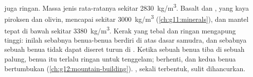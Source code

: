  juga ringan. Massa jenis rata-ratanya sekitar
\qty{2830}{kg/m^3}. Basalt dan  , yang kaya piroksen dan
olivin, mencapai sekitar \qty{3000}{kg/m^3} (\cref{ch:g11:minerals}), dan mantel
tepat di bawah  sekitar \qty{3380}{kg/m^3}. Kerak yang tebal dan ringan
mengapung tinggi: inilah sebabnya benua-benua berdiri di atas dasar samudra,
dan sebabnya sebuah benua tidak dapat diseret turun di . Ketika
sebuah benua tiba di sebuah palung, benua itu terlalu ringan untuk tenggelam;
 berhenti, dan kedua benua bertumbukan
(\cref{ch:g12:mountain-building}). , sekali terbentuk, sulit
dihancurkan.


